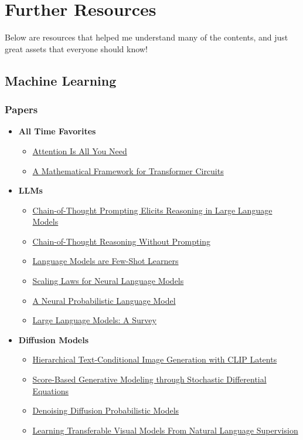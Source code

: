\documentclass[../../../main.tex]{subfiles}
\begin{document}
\chapter{Further Resources}

Below are resources that helped me understand many of the contents,
and just great assets that everyone should know!

\section{Machine Learning}

\subsection*{Papers}
\vspace{-0.5\baselineskip}
\begin{itemize}[noitemsep]
\item \textbf{All Time Favorites}
\begin{itemize}[noitemsep]
\item
\href{https://arxiv.org/abs/1706.03762}{Attention Is All You Need}
\item
\href{https://transformer-circuits.pub/2021/framework/index.html}{A Mathematical Framework for Transformer Circuits}
\end{itemize}

\item \textbf{LLMs}
\begin{itemize}[noitemsep]
\item
\href{https://arxiv.org/abs/2201.11903}{Chain-of-Thought Prompting Elicits Reasoning in Large Language Models}
\item
\href{https://arxiv.org/abs/2402.10200}{Chain-of-Thought Reasoning Without Prompting}
\item
\href{https://arxiv.org/abs/2005.14165}{Language Models are Few-Shot Learners}
\item
\href{https://arxiv.org/abs/2001.08361}{Scaling Laws for Neural Language Models}
\item
\href{https://www.jmlr.org/papers/volume3/bengio03a/bengio03a.pdf}{A Neural Probabilistic Language Model}
\item
\href{https://arxiv.org/abs/2402.06196}{Large Language Models: A Survey}
\end{itemize}

\item \textbf{Diffusion Models}
\begin{itemize}[noitemsep]
\item
\href{https://arxiv.org/abs/2204.06125}{Hierarchical Text-Conditional Image Generation with CLIP Latents}
\item
\href{https://arxiv.org/abs/2011.13456}{Score-Based Generative Modeling through Stochastic Differential Equations}
\item
\href{https://arxiv.org/abs/2006.11239}{Denoising Diffusion Probabilistic Models}
\item
\href{https://arxiv.org/abs/2103.00020}{Learning Transferable Visual Models From Natural Language Supervision}
\end{itemize}
\end{itemize}
\end{document}
